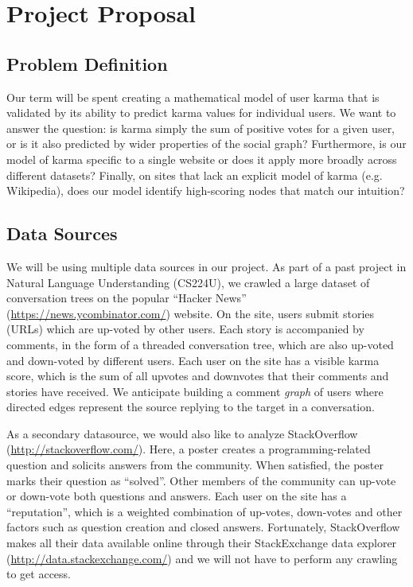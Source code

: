 \documentclass[10pt]{article}
\begin{document}
\section{Project Proposal} \subsection{Problem Definition}
Our term will be spent creating a mathematical model of user karma that is
validated by its ability to predict karma values for individual users. We want
to answer the question: is karma simply the sum of positive votes for a given
user, or is it also predicted by wider properties of the social graph?
Furthermore, is our model of karma specific to a single website or does it apply
more broadly across different datasets?  Finally, on sites that lack an explicit
model of karma (e.g. Wikipedia), does our model identify high-scoring nodes that
match our intuition?

\subsection{Data Sources}
We will be using multiple data sources in our project. As part of a past project
in Natural Language Understanding (CS224U), we crawled a large dataset of
conversation trees on the popular ``Hacker News''
(\url{https://news.ycombinator.com/}) website. On the site, users submit stories
(URLs) which are up-voted by other users. Each story is accompanied by comments,
in the form of a threaded conversation tree, which are also up-voted and
down-voted by different users. Each user on the site has a visible karma score,
which is the sum of all upvotes and downvotes that their comments and stories
have received.  We anticipate building a comment \textit{graph} of users where
directed edges represent the source replying to the target in a conversation.

As a secondary datasource, we would also like to analyze StackOverflow
(\url{http://stackoverflow.com/}). Here, a poster creates a programming-related
question and solicits answers from the community. When satisfied, the poster
marks their question as ``solved''. Other members of the community can up-vote
or down-vote both questions and answers. Each user on the site has a
``reputation'', which is a weighted combination of up-votes, down-votes and
other factors such as question creation and closed answers. Fortunately,
StackOverflow makes all their data available online through their StackExchange
data explorer (\url{http://data.stackexchange.com/}) and we will not have to
perform any crawling to get access.
\end{document}
